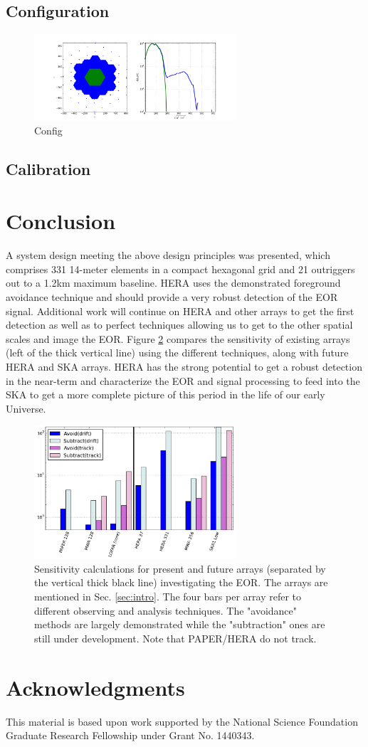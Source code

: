 \documentclass{article}
\begin{document}
\subsection{Configuration}
\label{sec:config}
\begin{figure}[t]
\centerline{
\includegraphics[width=7.5cm]{plots/config.png} 
}
\caption{\small Config
\label{fig:config}}
\end{figure}

\subsection{Calibration}

\section{Conclusion}
A system design meeting the above design principles was presented, which comprises 331 14-meter elements in a compact hexagonal grid and 21 outriggers out to a 1.2km maximum baseline.  HERA uses the demonstrated foreground avoidance technique and should provide a very robust detection of the EOR signal.  Additional work will continue on HERA and other arrays to get the first detection as well as to perfect techniques allowing us to get to the other spatial scales and image the EOR.  Figure \ref{fig:eorsense} compares the sensitivity of existing arrays (left of the thick vertical line) using the different techniques, along with future HERA and SKA arrays.  HERA has the strong potential to get a robust detection in the near-term and characterize the EOR and signal processing to feed into the SKA to get a more complete picture of this period in the life of our early Universe.

\begin{figure}[t]
\centerline{
\includegraphics[width=7.5cm]{plots/eorsens.png} 
}
\caption{\small Sensitivity calculations for present and future arrays  (separated by the vertical thick black line) investigating the EOR.
The arrays are mentioned in Sec. \ref{sec:intro}.  The four bars per array refer to different observing and analysis techniques.  The "avoidance" 
methods are largely demonstrated while the "subtraction" ones are still under development.  Note that PAPER/HERA do not track.
\label{fig:eorsense}}
\end{figure}
\section*{Acknowledgments}
This material is based upon work supported by the National Science Foundation Graduate Research Fellowship under Grant No. 1440343.


\end{document}

